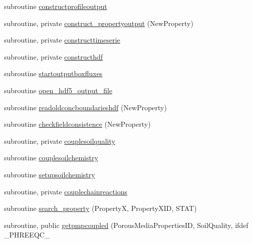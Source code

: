 \begin{DoxyCompactItemize}
subroutine \mbox{\hyperlink{namespacemoduleporousmediaproperties_a8c45fef7355c15cfadf2a6d30d9bbb24}{constructprofileoutput}}
\item 
subroutine, private \mbox{\hyperlink{namespacemoduleporousmediaproperties_acd8b0a3775ea88f8c55b0a2d1eaa957f}{construct\+\_\+propertyoutput}} (New\+Property)
\item 
subroutine, private \mbox{\hyperlink{namespacemoduleporousmediaproperties_af8b1e7f8c04441c79ef987887896d90a}{constructtimeserie}}
\item 
subroutine, private \mbox{\hyperlink{namespacemoduleporousmediaproperties_aecdb9ca882593072d63d590749b53ee9}{constructhdf}}
\item 
subroutine \mbox{\hyperlink{namespacemoduleporousmediaproperties_a0c7ca57252cdb274ae0ce23c3deeba74}{startoutputboxfluxes}}
\item 
subroutine \mbox{\hyperlink{namespacemoduleporousmediaproperties_a03262673fc0a9c3eece9a35a7e11e852}{open\+\_\+hdf5\+\_\+output\+\_\+file}}
\item 
subroutine \mbox{\hyperlink{namespacemoduleporousmediaproperties_abf58df3d1437a63cdfba7d236b8d0fa9}{readoldconcboundarieshdf}} (New\+Property)
\item 
subroutine \mbox{\hyperlink{namespacemoduleporousmediaproperties_a2f7af623d77295c6b462fed30cf66e1b}{checkfieldconsistence}} (New\+Property)
\item 
subroutine, private \mbox{\hyperlink{namespacemoduleporousmediaproperties_a61f775b3725813d36065a3b82e4cdb20}{couplesoilquality}}
\item 
subroutine \mbox{\hyperlink{namespacemoduleporousmediaproperties_aee3bf1633a5fbeea01e36455f4b4559c}{couplesoilchemistry}}
\item 
subroutine \mbox{\hyperlink{namespacemoduleporousmediaproperties_a3cc1f6f3ccfd4d997cac22737bc1093f}{setupsoilchemistry}}
\item 
subroutine, private \mbox{\hyperlink{namespacemoduleporousmediaproperties_a2d7950fe81dbe3ec4b45b30ce9e19e5c}{couplechainreactions}}
\item 
subroutine \mbox{\hyperlink{namespacemoduleporousmediaproperties_af477cac3aa38958d32a9af0ae317241f}{search\+\_\+property}} (PropertyX, Property\+X\+ID, S\+T\+AT)
\item 
subroutine, public \mbox{\hyperlink{namespacemoduleporousmediaproperties_acf31c9d94d5dc07a5b27c954a6895abb}{getpmpcoupled}} (Porous\+Media\+Properties\+ID, Soil\+Quality, ifdef \+\_\+\+P\+H\+R\+E\+E\+Q\+C\+\_\+
\item 

\end{DoxyCompactItemize}

